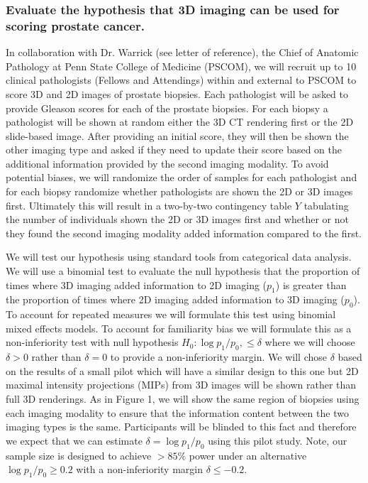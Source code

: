 \documentclass{NIHGrant}
\theoremstyle{theorem}
\begin{document}
\subsubsection*{Evaluate the hypothesis that 3D imaging can be used for scoring prostate cancer.}
In collaboration with Dr. Warrick (see letter of reference), the Chief of Anatomic Pathology at Penn State College of Medicine (PSCOM), we will recruit up to 10 clinical pathologists (Fellows and Attendings) within and external to PSCOM to score 3D and 2D images of prostate biopsies. Each pathologist will be asked to provide Gleason scores for each of the prostate biopsies. For each biopsy a pathologist will be shown at random either the 3D CT rendering first or the 2D slide-based image. After providing an initial score, they will then be shown the other imaging type and asked if they need to update their score based on the additional information provided by the second imaging modality. To avoid potential biases, we will randomize the order of samples for each pathologist and for each biopsy randomize whether pathologists are shown the 2D or 3D images first. Ultimately this will result in a two-by-two contingency table \(Y\) tabulating the number of individuals shown the 2D or 3D images first and whether or not they found the second imaging modality added information compared to the first.

We will test our hypothesis using standard tools from categorical data analysis. We will use a binomial test to evaluate the null hypothesis that the proportion of times where 3D imaging added information to 2D imaging (\(p_{1}\)) is greater than the proportion of times where 2D imaging added information to 3D imaging (\(p_{0}\)). To account for repeated measures we will formulate this test using binomial mixed effects models. To account for familiarity bias we will formulate this as a non-inferiority test with null hypothesis \(H_{0}:\log p_{1}/p_{0},\leq \delta\) where we will choose  \(\delta>0\) rather than \(\delta=0\) to provide a non-inferiority margin. We will chose \(\delta\) based on the results of a small pilot which will have a similar design to this one but 2D maximal intensity projections (MIPs) from 3D images will be shown rather than full 3D renderings. As in Figure 1, we will show the same region of biopsies using each imaging modality to ensure that the information content between the two imaging types is the same. Participants will be blinded to this fact and therefore we expect that we can estimate \(\delta=\log p_{1}/p_{0}\) using this pilot study. Note, our sample size is designed to achieve \(>85\%\) power under an alternative \(\log p_{1}/p_{0}\geq 0.2\) with a non-inferiority margin \(\delta\leq-0.2\).
\end{document}
